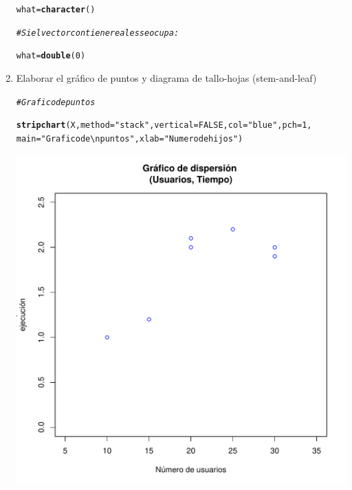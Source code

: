 \documentclass[12pt,letterpaper]{article}\usepackage[]{graphicx}\usepackage[]{color}
\makeatletter
\def\maxwidth{ %
  \ifdim\Gin@nat@width>\linewidth
    \linewidth
  \else
    \Gin@nat@width
  \fi
}
\newcommand{\hlnum}[1]{\textcolor[rgb]{0.686,0.059,0.569}{#1}}%
\newcommand{\hlstr}[1]{\textcolor[rgb]{0.192,0.494,0.8}{#1}}%
\newcommand{\hlcom}[1]{\textcolor[rgb]{0.678,0.584,0.686}{\textit{#1}}}%
\newcommand{\hlstd}[1]{\textcolor[rgb]{0.345,0.345,0.345}{#1}}%
\newcommand{\hlkwb}[1]{\textcolor[rgb]{0.69,0.353,0.396}{#1}}%
\newcommand{\hlkwc}[1]{\textcolor[rgb]{0.333,0.667,0.333}{#1}}%
\newcommand{\hlkwd}[1]{\textcolor[rgb]{0.737,0.353,0.396}{\textbf{#1}}}%
\newenvironment{kframe}{%
 \def\at@end@of@kframe{}%
 \ifinner\ifhmode%
  \def\at@end@of@kframe{\end{minipage}}%
  \begin{minipage}{\columnwidth}%
 \fi\fi%
 \def\FrameCommand##1{\hskip\@totalleftmargin \hskip-\fboxsep
 \colorbox{shadecolor}{##1}\hskip-\fboxsep
     \hskip-\linewidth \hskip-\@totalleftmargin \hskip\columnwidth}%
 \MakeFramed {\advance\hsize-\width
   \@totalleftmargin\z@ \linewidth\hsize
   \@setminipage}}%
 {\par\unskip\endMakeFramed%
 \at@end@of@kframe}
\newenvironment{knitrout}{}{} %
\makeatother
\begin{document}
\begin{enumerate}
\begin{knitrout}
\begin{kframe}
\begin{alltt}
\hlstd{what} \hlkwb{=} \hlkwd{character}\hlstd{()}
\end{alltt}
\end{kframe}
\end{knitrout}
\begin{knitrout}
\color{fgcolor}\begin{kframe}
\begin{alltt}
\hlcom{# Si el vector contiene reales se ocupa: }

 \hlstd{what} \hlkwb{=} \hlkwd{double}\hlstd{(}\hlnum{0}\hlstd{)}
\end{alltt}
\end{kframe}
\end{knitrout}

\item Elaborar el gr\'afico de puntos y diagrama de tallo-hojas (stem-and-leaf)

\begin{knitrout}
\color{fgcolor}\begin{kframe}
\begin{alltt}
\hlcom{# Grafico de puntos}

\hlkwd{stripchart}\hlstd{(X,} \hlkwc{method}\hlstd{=}\hlstr{"stack"}\hlstd{,} \hlkwc{vertical}\hlstd{=}\hlnum{FALSE}\hlstd{,} \hlkwc{col}\hlstd{=}\hlstr{"blue"}\hlstd{,} \hlkwc{pch}\hlstd{=}\hlnum{1}\hlstd{,}
\hlkwc{main}\hlstd{=}\hlstr{"Grafico de\textbackslash{}n puntos"}\hlstd{,} \hlkwc{xlab}\hlstd{=}\hlstr{"Numero de hijos"}\hlstd{)}
\end{alltt}
\end{kframe}
\includegraphics[width=\maxwidth]{figure/unnamed-chunk-9-1} 


\end{knitrout}
\end{enumerate}
\end{document}
